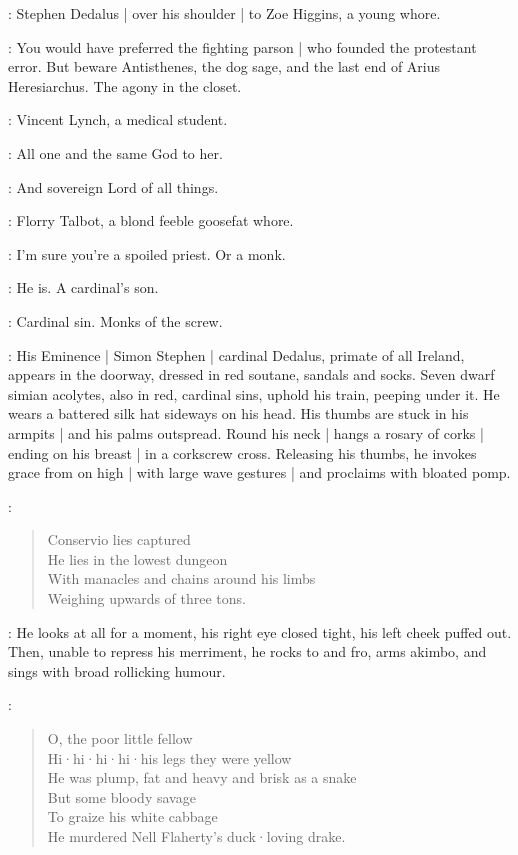 
:
Stephen Dedalus |
over his shoulder |
to Zoe Higgins,
a young whore.

\Stephen:
You would have preferred the fighting parson |
who founded the protestant error.
But beware Antisthenes,
the dog sage,
and the last end of Arius Heresiarchus.
The agony in the closet.

:
Vincent Lynch,
a medical student.

\Lynch:
All one and the same God to her.

\Stephen:
And sovereign Lord of all things.

:
Florry Talbot,
a blond feeble goosefat whore.

\Florry:
I'm sure you're a spoiled priest.
Or a monk.

\Lynch:
He is.
A cardinal's son.

\Stephen:
Cardinal sin.
Monks of the screw.

:
His Eminence |
Simon Stephen |
cardinal Dedalus,
primate of all Ireland,
appears in the doorway,
dressed in red soutane,
sandals and socks.
Seven dwarf simian acolytes,
also in red,
cardinal sins,
uphold his train,
peeping under it.
He wears a battered silk hat sideways on his head.
His thumbs are stuck in his armpits |
and his palms outspread.
Round his neck |
hangs a rosary of corks |
ending on his breast |
in a corkscrew cross.
%
Releasing his thumbs,
he invokes grace from on high |
with large wave gestures |
and proclaims with bloated pomp.

\Cardinal:
\begin{verse}
    Conservio lies captured\\
    He lies in the lowest dungeon\\
    With manacles and chains around his limbs\\
    Weighing upwards of three tons.
\end{verse}

:
He looks at all for a moment,
his right eye closed tight,
his left cheek puffed out.
Then,
unable to repress his merriment,
he rocks to and fro,
%
arms akimbo,
and sings with broad rollicking humour.

\Cardinal:
\begin{verse}
    O, the poor little fellow\\
    Hi·hi·hi·hi·his legs they were yellow\\
    He was plump, fat and heavy and brisk as a snake\\
    But some bloody savage\\
    To graize his white cabbage\\
    He murdered Nell Flaherty's duck·loving drake.
\end{verse}

